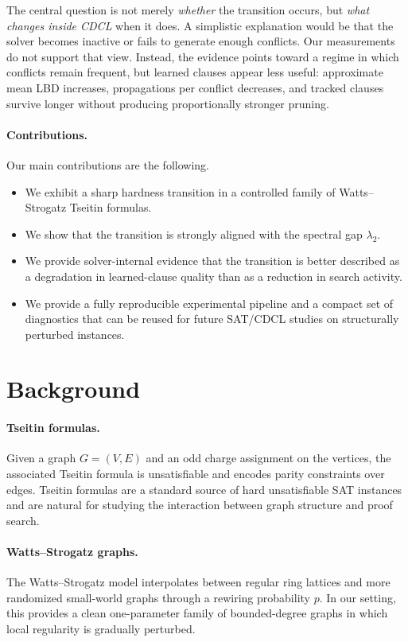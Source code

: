 \documentclass[11pt]{article}
\begin{document}
The central question is not merely \emph{whether} the transition occurs, but \emph{what changes inside CDCL} when it does. A simplistic explanation would be that the solver becomes inactive or fails to generate enough conflicts. Our measurements do not support that view. Instead, the evidence points toward a regime in which conflicts remain frequent, but learned clauses appear less useful: approximate mean LBD increases, propagations per conflict decreases, and tracked clauses survive longer without producing proportionally stronger pruning.

\paragraph{Contributions.}
Our main contributions are the following.
\begin{itemize}[leftmargin=1.5em]
    \item We exhibit a sharp hardness transition in a controlled family of Watts--Strogatz Tseitin formulas.
    \item We show that the transition is strongly aligned with the spectral gap $\lambda_2$.
    \item We provide solver-internal evidence that the transition is better described as a degradation in learned-clause quality than as a reduction in search activity.
    \item We provide a fully reproducible experimental pipeline and a compact set of diagnostics that can be reused for future SAT/CDCL studies on structurally perturbed instances.
\end{itemize}

\section{Background}

\paragraph{Tseitin formulas.}
Given a graph $G=(V,E)$ and an odd charge assignment on the vertices, the associated Tseitin formula is unsatisfiable and encodes parity constraints over edges. Tseitin formulas are a standard source of hard unsatisfiable SAT instances and are natural for studying the interaction between graph structure and proof search.

\paragraph{Watts--Strogatz graphs.}
The Watts--Strogatz model interpolates between regular ring lattices and more randomized small-world graphs through a rewiring probability $p$. In our setting, this provides a clean one-parameter family of bounded-degree graphs in which local regularity is gradually perturbed.
\end{document}
